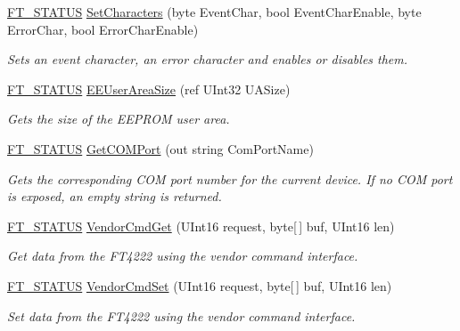 \begin{DoxyCompactItemize}
\mbox{\hyperlink{class_f_t_d2_x_x___n_e_t_1_1_f_t_d_i_aabe20ad905cc4ccc1e35dd5b877d9a83}{F\+T\+\_\+\+S\+T\+A\+T\+US}} \mbox{\hyperlink{class_f_t_d2_x_x___n_e_t_1_1_f_t_d_i_a28403b9c4db4f77e595144d9eefeb38b}{Set\+Characters}} (byte Event\+Char, bool Event\+Char\+Enable, byte Error\+Char, bool Error\+Char\+Enable)
\begin{DoxyCompactList}\small\item\em Sets an event character, an error character and enables or disables them. \end{DoxyCompactList}\item 
\mbox{\hyperlink{class_f_t_d2_x_x___n_e_t_1_1_f_t_d_i_aabe20ad905cc4ccc1e35dd5b877d9a83}{F\+T\+\_\+\+S\+T\+A\+T\+US}} \mbox{\hyperlink{class_f_t_d2_x_x___n_e_t_1_1_f_t_d_i_a024726d9c80da5c26a1cb6c93791e0d2}{E\+E\+User\+Area\+Size}} (ref U\+Int32 U\+A\+Size)
\begin{DoxyCompactList}\small\item\em Gets the size of the E\+E\+P\+R\+OM user area. \end{DoxyCompactList}\item 
\mbox{\hyperlink{class_f_t_d2_x_x___n_e_t_1_1_f_t_d_i_aabe20ad905cc4ccc1e35dd5b877d9a83}{F\+T\+\_\+\+S\+T\+A\+T\+US}} \mbox{\hyperlink{class_f_t_d2_x_x___n_e_t_1_1_f_t_d_i_a48b2bcf58e56f1008ce86e526753d982}{Get\+C\+O\+M\+Port}} (out string Com\+Port\+Name)
\begin{DoxyCompactList}\small\item\em Gets the corresponding C\+OM port number for the current device. If no C\+OM port is exposed, an empty string is returned. \end{DoxyCompactList}\item 
\mbox{\hyperlink{class_f_t_d2_x_x___n_e_t_1_1_f_t_d_i_aabe20ad905cc4ccc1e35dd5b877d9a83}{F\+T\+\_\+\+S\+T\+A\+T\+US}} \mbox{\hyperlink{class_f_t_d2_x_x___n_e_t_1_1_f_t_d_i_a9acbc4c54ca25e1281acb499e2df6b32}{Vendor\+Cmd\+Get}} (U\+Int16 request, byte\mbox{[}$\,$\mbox{]} buf, U\+Int16 len)
\begin{DoxyCompactList}\small\item\em Get data from the F\+T4222 using the vendor command interface. \end{DoxyCompactList}\item 
\mbox{\hyperlink{class_f_t_d2_x_x___n_e_t_1_1_f_t_d_i_aabe20ad905cc4ccc1e35dd5b877d9a83}{F\+T\+\_\+\+S\+T\+A\+T\+US}} \mbox{\hyperlink{class_f_t_d2_x_x___n_e_t_1_1_f_t_d_i_ac8eb155b363e5e19269cebe82dd9f411}{Vendor\+Cmd\+Set}} (U\+Int16 request, byte\mbox{[}$\,$\mbox{]} buf, U\+Int16 len)
\begin{DoxyCompactList}\small\item\em Set data from the F\+T4222 using the vendor command interface. \end{DoxyCompactList}\end{DoxyCompactItemize}
